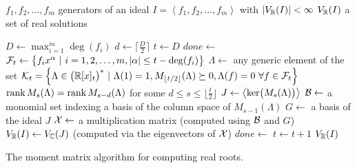 \begin{algorithm}[ht]
  \begin{algorithmic}[1]
    \Require
      \Statex $f_1, f_2, \ldots, f_m$ generators of an ideal $I = \left<f_1, f_2, \ldots, f_m\right>$ with $|V_{\mathbb{R}}(I)|<\infty$
    \Ensure
      \Statex $V_{\mathbb{R}}(I)$ a set of real solutions
      \Statex

    \State $D \gets \max_{i=1}^m\deg(f_i)$
    \State $d \gets \Big\lceil \frac{D}{2} \Big\rceil$
    \State $t \gets D$
    \State $done \gets$ \False
    \State $\mathcal{F}_t \gets \big\{f_ix^\alpha\ |\ i = 1, 2, \ldots, m, |\alpha|\leq t-\deg(f_i)\big\}$
    \State $\Lambda \gets$ any generic element of the set $\mathcal{K}_t = \Big\{\Lambda\in\big(\mathbb{R}[x]_{t}\big)^*\ |\ \Lambda(1) = 1, M_{\lfloor t/2\rfloor}(\Lambda) \succeq 0, \Lambda(f) = 0 \ \forall f\in\mathcal{F}_t\Big\}$
      \StatexIndent[1]$\operatorname{rank}M_s(\Lambda)=\operatorname{rank} M_{s-d}(\Lambda)$ for some $d \leq s \leq \big\lfloor\frac{t}{2}\big\rfloor$ \algorithmicthen
      \State $J \gets \left<\operatorname{ker}\!\big(M_s(\Lambda)\big)\right>$
      \State $\mathcal{B} \gets$ a monomial set indexing a basis of the column space of $M_{s-1}(\Lambda)$
      \State $G \gets$ a basis of the ideal $J$
      \State $\mathcal{X} \gets$ a multiplication matrix (computed using $\mathcal{B}$ and $G$)
      \State $V_{\mathbb{R}}(I) \gets V_{\mathbb{C}}(J)$ (computed via the eigenvectors of $\mathcal{X}$)
      \State $done \gets$ \True
    \Else
      \State $t \gets t + 1$
    \EndIf
    \EndWhile
    \State \Return $V_{\mathbb{R}}(I)$

  \end{algorithmic}
  \caption{The moment matrix algorithm for computing real roots. \cite[Algorithm~1]{momentMethod}}
\end{algorithm}
